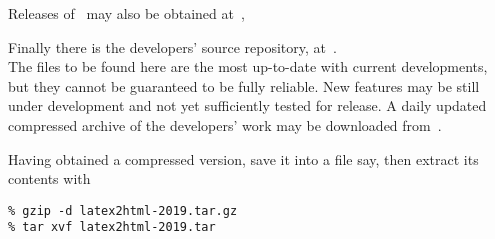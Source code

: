 %
Releases of \latextohtml\ may also be obtained at
\,,

\bigskip
{}\label{cvsrepos}%
\noindent
Finally there is the \latextohtml{} developers' source repository, at \CVSrepos\,.\\
The files to be found here are the most up-to-date with current developments,
but they cannot be guaranteed to be fully reliable. New features may be
still under development and not yet sufficiently tested for release.
A daily updated compressed archive of the developers' work may be
downloaded from \CVSlatest\,.

\htmlrule{}%
\medskip\noindent
Having obtained a compressed  version, save it into a file 
 say,
then extract its contents with 
\begin{small}
\begin{verbatim}
% gzip -d latex2html-2019.tar.gz
% tar xvf latex2html-2019.tar
\end{verbatim} 
\end{small}
%

